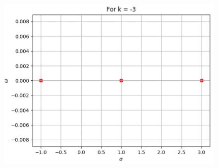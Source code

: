 \begin{figure}[!ht]
\begin{center}
\includegraphics[scale = 0.5]{./figs/ee18btech11039_3.eps}
\end{center}
\label{fig:ee18btech11039}
\end{figure}


